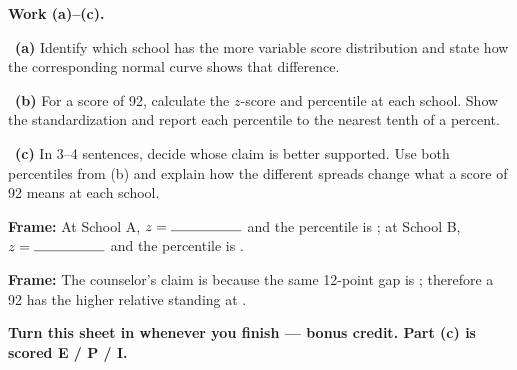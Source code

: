 \documentclass[11pt]{article}
\begin{document}
\newpage
\textbf{Work (a)--(c).}\par\smallskip

~\textbf{(a)} Identify which school has the more variable score distribution and state how the corresponding normal curve shows that difference.\par
\workspace{0.7in}

~\textbf{(b)} For a score of 92, calculate the $z$-score and percentile at each school. Show the standardization and report each percentile to the nearest tenth of a percent.\par
\workspace{1.4in}

~\textbf{(c)} In 3--4 sentences, decide whose claim is better supported. Use both percentiles from (b) and explain how the different spreads change what a score of 92 means at each school.\par
\workspace{2.0in}

\begin{sentenceframebox}\raggedright\textbf{Frame:} At School A, $z=\blank[0.7in]$ and the percentile is \blank[0.8in]; at School B, $z=\blank[0.7in]$ and the percentile is \blank[0.8in].\end{sentenceframebox}

\begin{sentenceframebox}\raggedright\textbf{Frame:} The counselor's claim is \blank[1.0in] because the same 12-point gap is \blank[2.4in]; therefore a 92 has the higher relative standing at \blank[0.8in].\end{sentenceframebox}

\textbf{Turn this sheet in whenever you finish --- bonus credit. Part (c) is scored E / P / I.}\par
\end{document}
